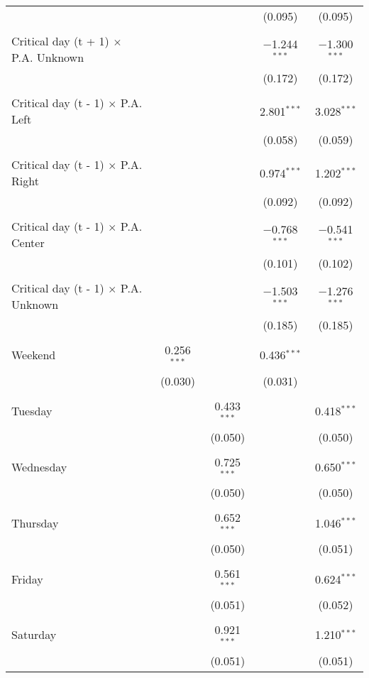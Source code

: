 \documentclass[
]{article}
\begin{document}
\begin{table}[!htbp]
{\begin{tabular}{@{\extracolsep{5pt}}lcccc}
  &  &  & (0.095) & (0.095) \\ 
  & & & & \\ 
 Critical day (t + 1) $\times$ P.A. Unknown &  &  & $-$1.244$^{***}$ & $-$1.300$^{***}$ \\ 
  &  &  & (0.172) & (0.172) \\ 
  & & & & \\ 
 Critical day (t - 1) $\times$ P.A. Left &  &  & 2.801$^{***}$ & 3.028$^{***}$ \\ 
  &  &  & (0.058) & (0.059) \\ 
  & & & & \\ 
 Critical day (t - 1) $\times$ P.A. Right &  &  & 0.974$^{***}$ & 1.202$^{***}$ \\ 
  &  &  & (0.092) & (0.092) \\ 
  & & & & \\ 
 Critical day (t - 1) $\times$ P.A. Center &  &  & $-$0.768$^{***}$ & $-$0.541$^{***}$ \\ 
  &  &  & (0.101) & (0.102) \\ 
  & & & & \\ 
 Critical day (t - 1) $\times$ P.A. Unknown &  &  & $-$1.503$^{***}$ & $-$1.276$^{***}$ \\ 
  &  &  & (0.185) & (0.185) \\ 
  & & & & \\ 
 Weekend & 0.256$^{***}$ &  & 0.436$^{***}$ &  \\ 
  & (0.030) &  & (0.031) &  \\ 
  & & & & \\ 
 Tuesday &  & 0.433$^{***}$ &  & 0.418$^{***}$ \\ 
  &  & (0.050) &  & (0.050) \\ 
  & & & & \\ 
 Wednesday &  & 0.725$^{***}$ &  & 0.650$^{***}$ \\ 
  &  & (0.050) &  & (0.050) \\ 
  & & & & \\ 
 Thursday &  & 0.652$^{***}$ &  & 1.046$^{***}$ \\ 
  &  & (0.050) &  & (0.051) \\ 
  & & & & \\ 
 Friday &  & 0.561$^{***}$ &  & 0.624$^{***}$ \\ 
  &  & (0.051) &  & (0.052) \\ 
  & & & & \\ 
 Saturday &  & 0.921$^{***}$ &  & 1.210$^{***}$ \\ 
  &  & (0.051) &  & (0.051) \\ 

\end{tabular}}
\end{table}
\end{document}
